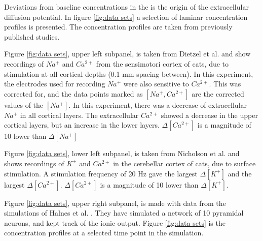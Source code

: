 \documentclass{article}
\begin{document}
Deviations from baseline concentrations in the is the origin of the extracellular diffusion potential. In figure \ref{fig:data sets} a selection of laminar concentration profiles is presented. The concentration profiles are taken from previously published studies. 

Figure \ref{fig:data sets}, upper left subpanel, is taken from Dietzel et al. and show recordings of $Na^+$ and $Ca^{2+}$ from the sensimotori cortex of cats, due to stimulation at all cortical depths (0.1 mm spacing between).  In this experiment, the electrodes used for recording $Na^+$ were also sensitive to $Ca^{2+}$. This was corrected for, and the data points marked as $[Na^+, Ca^{2+}]$ are the corrected values of the $[Na^+]$. In this experiment, there was a decrease of extracellular $Na^+$ in all cortical layers. The extracellular $Ca^{2+}$ showed a decrease in the upper cortical layers, but an increase in the lower layers. $\Delta [Ca^{2+}]$ is  a magnitude of 10 lower than  $\Delta [Na^+]$

Figure \ref{fig:data sets}, lower left subpanel, is taken from Nicholson et al. and shows recordings of $K^+$ and $Ca^{2+}$ in the cerebellar cortex of cats, due to surface stimulation. A stimulation frequency of 20 Hz gave the largest $\Delta [K^+]$ and the largest $\Delta [Ca^{2+}]$.   $\Delta [Ca^{2+}]$ is  a magnitude of 10 lower than  $\Delta [K^+]$.


Figure \ref{fig:data sets}, upper right subpanel, is made with data from the simulations of Halnes et al. \cite{Halnes2016}. They have simulated a network of 10 pyramidal neurons, and kept track of the ionic output. Figure \ref{fig:data sets} is the concentration profiles at a selected time point in the simulation.
\end{document}
